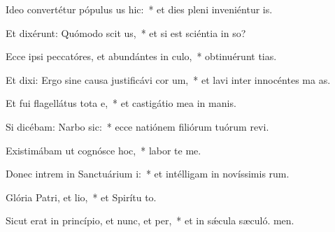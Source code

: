 \item Ideo convertétur pópulus us hic:~* et dies pleni inveniéntur  is.
\item Et dixérunt: Quómodo scit us,~* et si est sciéntia in so?
\item Ecce ipsi peccatóres, et abundántes in culo,~* obtinuérunt tias.
\item Et dixi: Ergo sine causa justificávi cor um,~* et lavi inter innocéntes ma as.
\item Et fui flagellátus tota e,~* et castigátio mea in manis.
\item Si dicébam: Narbo sic:~* ecce natiónem filiórum tuórum revi.
\item Existimábam ut cognósce hoc,~* labor  te me.
\item Donec intrem in Sanctuárium i:~* et intélligam in novíssimis rum.
\item Glória Patri, et lio,~* et Spirítu to.
\item Sicut erat in princípio, et nunc, et per,~* et in sǽcula sæculó. men.
